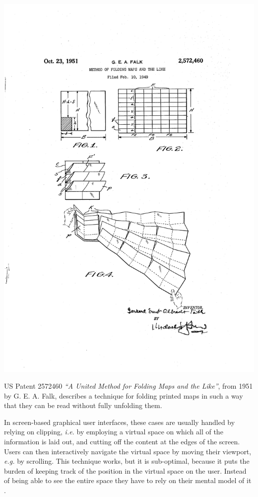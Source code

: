 \documentclass[nobib]{tufte-book} %
\newcommand{\hairsp}{\hspace{1pt}} %
\newcommand{\ie}{\textit{i.\hairsp{}e.}\xspace} %
\newcommand{\eg}{\textit{e.\hairsp{}g.}\xspace} %
\begin{document}
\begin{marginfigure}
  \includegraphics[width=\linewidth]{falk-patent.png}
  \caption{US Patent 2572460 \emph{``A United Method for Folding Maps and the Like''}, from 1951 by G. E. A. Falk, describes a technique for folding printed maps in such a way that they can be read without fully unfolding them.}
  \label{fig:falkmap}
\end{marginfigure}

In screen-based graphical user interfaces, these cases are usually handled by relying on clipping, \ie by employing a virtual space on which all of the information is laid out, and cutting off the content at the edges of the screen. Users can then interactively navigate the virtual space by moving their viewport, \eg by scrolling. This technique works, but it is sub-optimal, because it puts the burden of keeping track of the position in the virtual space on the user. Instead of being able to see the entire space they have to rely on their mental model of it \cite{bederson2011promise}.
\end{document}

